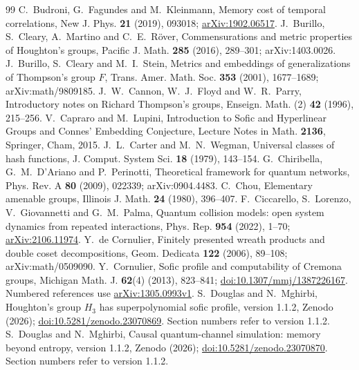 \begin{thebibliography}{99}
 C.~Budroni, G.~Fagundes and M.~Kleinmann, Memory cost of temporal correlations, New J. Phys. \textbf{21} (2019), 093018; \href{https://arxiv.org/abs/1902.06517}{arXiv:1902.06517}.
 J.~Burillo, S.~Cleary, A.~Martino and C.~E.~R\"over, Commensurations and metric properties of Houghton's groups, Pacific J. Math. \textbf{285} (2016), 289--301; arXiv:1403.0026.
 J.~Burillo, S.~Cleary and M.~I.~Stein, Metrics and embeddings of generalizations of Thompson's group $F$, Trans. Amer. Math. Soc. \textbf{353} (2001), 1677--1689; arXiv:math/9809185.
 J.~W.~Cannon, W.~J.~Floyd and W.~R.~Parry, Introductory notes on Richard Thompson's groups, Enseign. Math. (2) \textbf{42} (1996), 215--256.
 V.~Capraro and M.~Lupini, Introduction to Sofic and Hyperlinear Groups and Connes' Embedding Conjecture, Lecture Notes in Math. \textbf{2136}, Springer, Cham, 2015.
 J.~L.~Carter and M.~N.~Wegman, Universal classes of hash functions, J. Comput. System Sci. \textbf{18} (1979), 143--154.
 G.~Chiribella, G.~M.~D'Ariano and P.~Perinotti, Theoretical framework for quantum networks, Phys. Rev. A \textbf{80} (2009), 022339; arXiv:0904.4483.
 C.~Chou, Elementary amenable groups, Illinois J. Math. \textbf{24} (1980), 396--407.
 F.~Ciccarello, S.~Lorenzo, V.~Giovannetti and G.~M.~Palma, Quantum collision models: open system dynamics from repeated interactions, Phys. Rep. \textbf{954} (2022), 1--70; \href{https://arxiv.org/abs/2106.11974}{arXiv:2106.11974}.
 Y.~de Cornulier, Finitely presented wreath products and double coset decompositions, Geom. Dedicata \textbf{122} (2006), 89--108; arXiv:math/0509090.
 Y.~Cornulier, Sofic profile and computability of Cremona groups, Michigan Math. J. \textbf{62}(4) (2013), 823--841; \href{https://doi.org/10.1307/mmj/1387226167}{doi:10.1307/mmj/1387226167}. Numbered references use \href{https://arxiv.org/abs/1305.0993v1}{arXiv:1305.0993v1}.
 S.~Douglas and N.~Mghirbi, Houghton's group $H_3$ has superpolynomial sofic profile, version 1.1.2, Zenodo (2026); \href{https://doi.org/10.5281/zenodo.23070869}{doi:10.5281/zenodo.23070869}. Section numbers refer to version 1.1.2.
 S.~Douglas and N.~Mghirbi, Causal quantum-channel simulation: memory beyond entropy, version 1.1.2, Zenodo (2026); \href{https://doi.org/10.5281/zenodo.23070870}{doi:10.5281/zenodo.23070870}. Section numbers refer to version 1.1.2.

\end{thebibliography}
